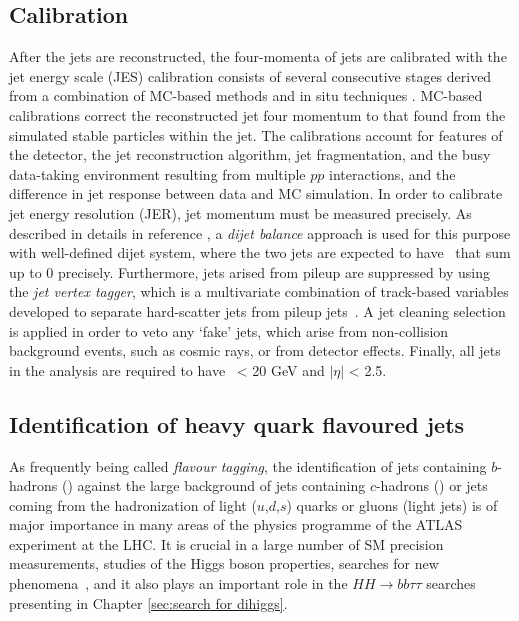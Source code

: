 \subsection{Calibration}
After the jets are reconstructed, the four-momenta of jets
are calibrated with the jet energy scale (JES) calibration
consists of several consecutive stages derived from a
combination of MC-based methods and in situ techniques \cite{PERF-2016-04}.
MC-based calibrations correct the reconstructed jet four momentum 
to that found from the simulated stable particles 
within the jet. 
The calibrations account for features of the
detector, the jet reconstruction algorithm, jet fragmentation,
and the busy data-taking environment resulting from multiple $pp$ 
interactions, and the difference in jet response between
data and MC simulation.
In order to calibrate jet energy resolution (JER),
jet momentum must be measured precisely. 
As described in details in reference \cite{JETM-2018-05},
a \textit{dijet balance} approach is used for this purpose with well-defined dijet system,
where the two jets are expected to have \pt\ that sum up to 0 precisely.
Furthermore, jets arised from pileup are suppressed by using the 
\textit{jet vertex tagger}, which is a multivariate 
combination of track-based variables developed to separate 
hard-scatter jets from pileup jets~\cite{ATLAS-CONF-2014-018}.
A jet cleaning selection is applied in order to veto any `fake' jets, 
which arise from non-collision background events, such as cosmic rays, 
or from detector effects. 
Finally, all jets in the analysis are required to have \pt\ < 20 GeV 
and $|\eta|$ < 2.5.


\subsection{Identification of heavy quark flavoured jets}
\label{sec:Flavour tagging}
As frequently being called \textit{flavour tagging}, 
the identification of jets containing $b$-hadrons (\bjets) 
against the large background of jets containing $c$-hadrons 
(\cjets) or jets coming from the hadronization of light ($u$,$d$,$s$) 
quarks or gluons (light jets) is of major importance in many areas of the 
physics programme of the ATLAS experiment at the LHC. 
It is crucial in a large number of SM
precision measurements, studies of the Higgs boson properties, 
searches for new phenomena~\cite{SUSY-2014-08, ATLAS-CONF-2018-043,Interpreting_Higgs_result},
and it also plays an important role in 
the $HH \to bb\tau\tau$ searches presenting in Chapter \ref{sec:search for dihiggs}. 

